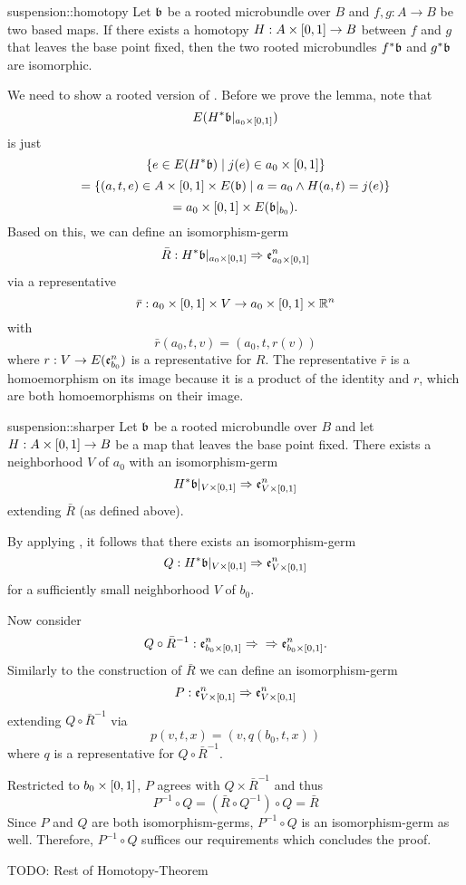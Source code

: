 \begin{mytheorem}{suspension::homotopy}%
    Let $\mathfrak{b}$ be a rooted microbundle over $B$ and $f, g: A \to B$ be two based maps.
    If there exists a homotopy $H: A \times [0, 1] \to B$ between $f$ and $g$ that leaves the base point fixed,
    then the two rooted microbundles $f^*\mathfrak{b}$ and $g^*\mathfrak{b}$ are isomorphic.
\end{mytheorem}

\begin{myparagraph}
    We need to show a rooted version of .
    Before we prove the lemma, note that 
    \[ E(H^*\mathfrak{b}\vert_{a_0 \times [0, 1]}) \]
    is just
    \[ \{ e \in E(H^*\mathfrak{b}) \mid j(e) \in a_0 \times [0, 1] \} \]
    \[ = \{ (a, t, e) \in A \times [0, 1] \times E(\mathfrak{b}) \mid a = a_0 \land H(a, t) = j(e) \} \]
    \[ = a_0 \times [0, 1] \times E(\mathfrak{b}\vert_{b_0}). \]
    Based on this, we can define an isomorphism-germ
    \[ \bar{R}: H^*\mathfrak{b}\vert_{a_0 \times [0, 1]} \Rightarrow{}{} \mathfrak{e}^{n}_{a_0 \times [0, 1]} \]
    via a representative
    \[ \bar{r}: a_0 \times [0, 1] \times V \to a_0 \times [0, 1] \times \mathbb{R}^n \]
    with
    \[ \bar{r}(a_0, t, v) = (a_0, t, r(v) )\]
    where $r: V \to E(\mathfrak{e}^{n}_{b_0})$ is a representative for $R$.
    The representative $\bar{r}$ is a homoemorphism on its image
    because it is a product of the identity and $r$, which are both homoemorphisms on their image. 
\end{myparagraph}
\begin{mylemma}{suspension::sharper}
    Let $\mathfrak{b}$ be a rooted microbundle over $B$ and let $H: A \times [0, 1] \to B$ be a map that leaves the base point fixed.
    There exists a neighborhood $V$ of $a_0$ with an isomorphism-germ
    \[ H^*\mathfrak{b}\vert_{V \times [0, 1]} \Rightarrow{}{} \mathfrak{e}^{n}_{V \times [0, 1]} \]
    extending $\bar{R}$ (as defined above).
\end{mylemma}
\begin{myproof}
    By applying , it follows that there exists an isomorphism-germ
    \[ Q: H^*\mathfrak{b}\vert_{V \times [0, 1]} \Rightarrow{}{} \mathfrak{e}^{n}_{V \times [0, 1]} \]
    for a sufficiently small neighborhood $V$ of $b_0$.

    Now consider
    \[ Q \circ \bar{R}^{-1}: \mathfrak{e}^{n}_{b_0 \times [0, 1]} \Rightarrow{}{} \Rightarrow{} \mathfrak{e}^{n}_{b_0 \times [0, 1]}. \]
    Similarly to the construction of $\bar{R}$ we can define an isomorphism-germ
    \[ P: \mathfrak{e}^{n}_{V \times [0, 1]} \Rightarrow{}{} \mathfrak{e}^{n}_{V \times [0, 1]} \]
    extending $Q \circ \bar{R}^{-1}$ via
    \[ p(v, t, x) = (v, q(b_0, t, x)) \]
    where $q$ is a representative for $Q \circ \bar{R}^{-1}$.

    Restricted to $b_0 \times [0, 1]$, $P$ agrees with $Q \times \bar{R}^{-1}$ and thus
    \[ P^{-1} \circ Q = (\bar{R} \circ Q^{-1}) \circ Q = \bar{R} \]
    Since $P$ and $Q$ are both isomorphism-germs, $P^{-1} \circ Q$ is an isomorphism-germ as well.
    Therefore, $P^{-1} \circ Q$ suffices our requirements which concludes the proof.
\end{myproof}
TODO: Rest of Homotopy-Theorem